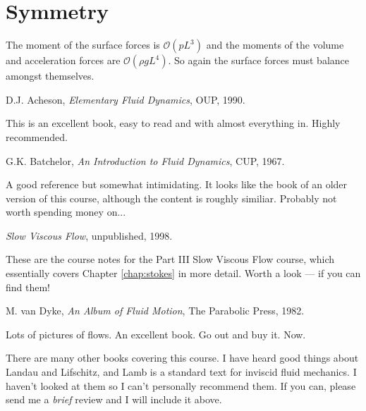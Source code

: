 \documentclass{notes}
\newcommand{\cO}{\mathcal{O}}
\theoremstyle{plain}
\begin{document}
\section*{Symmetry}

The moment of the surface forces is $\cO(p L^3)$ and the moments of
the volume and acceleration forces are $\cO(\rho g L^4)$.  So again
the surface forces must balance amongst themselves.

\begin{thebibliography}{9}
 D.J. Acheson, \emph{Elementary Fluid Dynamics}, OUP,
  1990.
  
  {\sffamily \small This is an excellent book, easy to read and with
    almost everything in.  Highly recommended. }
  
 G.K. Batchelor, \emph{An Introduction to Fluid
    Dynamics}, CUP, 1967.
  
  {\sffamily \small A good reference but somewhat intimidating.  It
    looks like the book of an older version of this course, although
    the content is roughly similiar. Probably not worth spending money
    on... }

 \emph{Slow Viscous Flow}, unpublished, 1998.

  {\sffamily \small These are the course notes for the Part III Slow
    Viscous Flow course, which essentially covers Chapter
    \ref{chap:stokes} in more detail.  Worth a look --- if you can
    find them! }
  
 M. van Dyke, \emph{An Album of Fluid Motion}, The
  Parabolic Press, 1982.
  
  {\sffamily \small Lots of pictures of flows.  An excellent book.  Go
    out and buy it.  Now.}

\end{thebibliography}

There are many other books covering this course.  I have heard good things
about Landau and Lifschitz, and Lamb is a standard text for inviscid
fluid mechanics.  I haven't looked at them so I can't personally recommend
them.  If you can, please send me a \emph{brief} review and I will include
it above.
\end{document}
